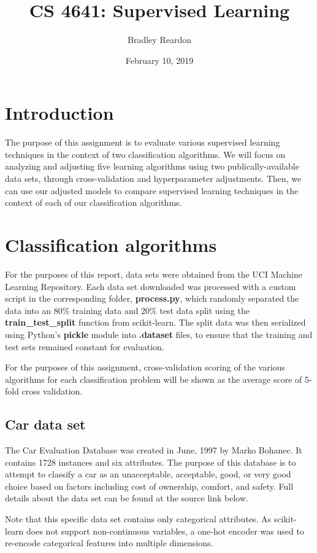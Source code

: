 \documentclass{article}
\title{\textbf{CS 4641:} Supervised Learning}
\author{Bradley Reardon}
\date{February 10, 2019}
\begin{document}
    \maketitle

    \section{Introduction}
    The purpose of this assignment is to evaluate various supervised learning techniques in the context of two classification algorithms. We will focus on analyzing and adjusting five learning algorithms using two publically-available data sets, through cross-validation and hyperparameter adjustments. Then, we can use our adjusted models to compare supervised learning techniques in the context of each of our classification algorithms.

    \section{Classification algorithms}
    For the purposes of this report, data sets were obtained from the UCI Machine Learning Repository. Each data set downloaded was processed with a custom script in the corresponding folder, \textbf{process.py}, which randomly separated the data into an 80\% training data and 20\% test data split using the \textbf{train\_test\_split} function from scikit-learn. The split data was then serialized using Python's \textbf{pickle} module into \textbf{.dataset} files, to ensure that the training and test sets remained constant for evaluation.

    For the purposes of this assignment, cross-validation scoring of the various algorithms for each classification problem will be shown as the average score of 5-fold cross validation.

    \subsection{Car data set}
    The Car Evaluation Database was created in June, 1997 by Marko Bohanec. It contains 1728 instances and six attributes. The purpose of this database is to attempt to classify a car as an unacceptable, acceptable, good, or very good choice based on factors including cost of ownership, comfort, and safety. Full details about the data set can be found at the source link below.

    Note that this specific data set contains only categorical attributes. As scikit-learn does not support non-continuous variables, a one-hot encoder was used to re-encode categorical features into multiple dimensions.
\end{document}
